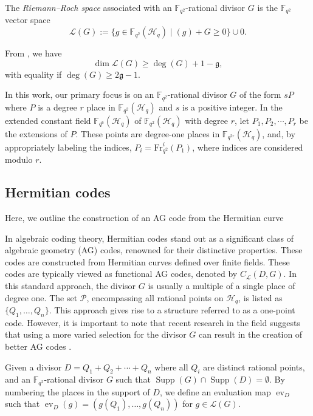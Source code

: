 \documentclass[entropy,article,submit,pdftex,moreauthors]{Definitions/mdpi}
\DeclareMathOperator{\ev}{ev}
\newcommand{\Supp}{\operatorname{Supp}}
\begin{document}
The \emph{Riemann--Roch space} associated with an  $\mathbb{F}_{q^2}$-rational divisor $G$ is the $\mathbb{F}_{q^2}$ vector space 
\[\mathscr{L}(G) := \{g \in \mathbb{F}_{q^2}(\mathscr{H}_q) \mid (g) + G \geq 0\} \cup {0}.\] 

From  \cite[Riemann's Theorem~1.4.17]{stichtenoth2009algebraic}, we have 
\[\dim\mathscr{L}(G) \geq \deg(G) +1 - \mathfrak{g},\] 
with equality if $\deg(G) \geq 2\mathfrak{g}-1$.

In this work, our primary focus is on an $\mathbb{F}_{q^2}$-rational divisor $G$ of the form $ sP$ where $P$ is a degree $r$ place in $\mathbb{F}_{q^2}(\mathscr{H}_q)$ and $s$ is a positive integer. In the extended constant field $\mathbb{F}_{q^6}(\mathscr{H}_q)$ of $\mathbb{F}_{q^2}(\mathscr{H}_q)$ with degree $r$, let $P_1, P_2, \cdots, P_r$ be the extensions of $P$. These points are degree-one places in $\mathbb{F}_{q^{2r}}(\mathscr{H}_q)$, and, by appropriately labeling the indices, $P_{i} = \text{Fr}^i_{q^2}(P_1)$, where indices are considered modulo $r$.




\subsection{Hermitian codes}
Here, we outline the construction of an AG code from the Hermitian curve


In algebraic coding theory, Hermitian codes stand out as a significant class of algebraic geometry (AG) codes, renowned for their distinctive properties. These codes are constructed from Hermitian curves defined over finite fields. These codes are typically viewed as functional AG codes, denoted by $C_{\mathcal{L}}(D, G)$. In this standard approach, the divisor $G$ is usually a multiple of a single place of degree one. The set $\mathcal{P}$, encompassing all rational points on $\mathscr{H}_q$, is listed as $\{Q_1, \ldots, Q_{n}\}$. This approach gives rise to a structure referred to as a one-point code. However, it is important to note that recent research in the field suggests that using a more varied selection for the divisor $G$ can result in the creation of better AG codes \cite{matthews2005one,korchmaros2013hermitian}.



Given a divisor $D=Q_1+Q_2+\cdots+Q_n$ where all $Q_i$ are distinct rational points, and an $\mathbb{F}_{q^2}$-rational divisor $G$ such that $\Supp(G) \cap \Supp(D) = \emptyset$. By numbering the places in the support of $D$, we define an evaluation map $\ev_{D}$ such that $\ev_{D}(g) = (g(Q_1),\dots,g(Q_n))$ for $g \in \mathscr{L}(G)$. 
\end{document}
